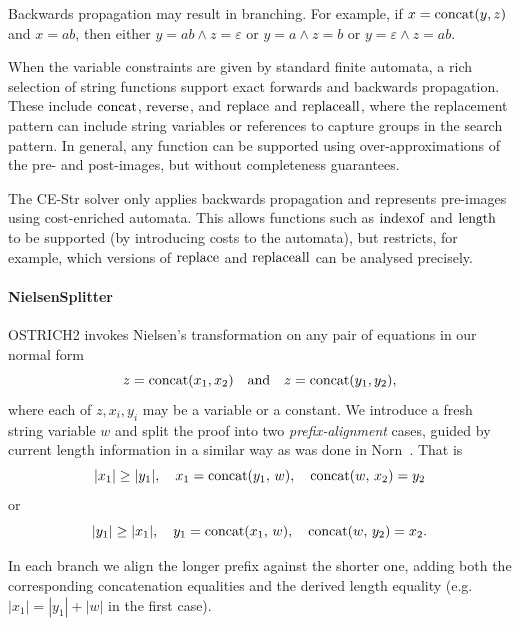 Backwards propagation may result in branching.
For example, if $x = \operatorname{concat}(y, z)$ and $x = ab$, then either $y = ab \land z = \varepsilon$ or $y = a \land z = b$ or $y = \varepsilon \land z = ab$.

When the variable constraints are given by standard finite automata, a rich selection of string functions support exact forwards and backwards propagation.
These include $\operatorname{concat}$, $\operatorname{reverse}$, and $\operatorname{replace}$ and $\operatorname{replaceall}$, where the replacement pattern can include string variables or references to capture groups in the search pattern.
In general, any function can be supported using over-approximations of the pre- and post-images, but without completeness guarantees.

The CE-Str solver only applies backwards propagation and represents pre-images using cost-enriched automata.
This allows functions such as $\operatorname{indexof}$ and $\operatorname{length}$ to be supported (by introducing costs to the automata), but restricts, for example, which versions of $\operatorname{replace}$ and $\operatorname{replaceall}$ can be analysed precisely.

\paragraph{NielsenSplitter}
OSTRICH2 invokes Nielsen’s transformation \cite{nielsen1,nielsen2} on any pair of equations in our normal form
\[
z = \operatorname{concat}(x_1,x_2)
\quad\text{and}\quad
z = \operatorname{concat}(y_1,y_2),
\]
where each of $z,x_i,y_i$ may be a variable or a constant.  We
introduce a fresh string variable $w$ and split the proof into two
\emph{prefix‐alignment} cases, guided by current length information in
a similar way as was done in Norn~\cite{DBLP:conf/cav/AbdullaACHRRS15}.
That is
\[
	|x_1|\ge|y_1|, \quad
	x_1 = \operatorname{concat}(y_1,\,w), \quad
	\operatorname{concat}(w,\,x_2) = y_2
\]
or
\[
	|y_1|\ge|x_1|, \quad
	y_1 = \operatorname{concat}(x_1,\,w), \quad
	\operatorname{concat}(w,\,y_2) = x_2.
\]

In each branch we align the longer prefix against the shorter one, adding both the corresponding concatenation equalities and the derived length equality (e.g.\ $|x_1|=|y_1|+|w|$ in the first case).

